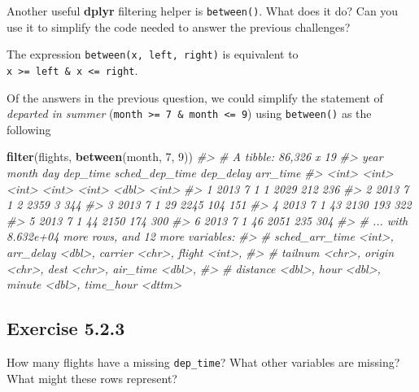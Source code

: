 \documentclass[]{book}
\newenvironment{Shaded}{\begin{snugshade}}{\end{snugshade}}
\newcommand{\CommentTok}[1]{\textcolor[rgb]{0.56,0.35,0.01}{\textit{#1}}}
\newcommand{\DecValTok}[1]{\textcolor[rgb]{0.00,0.00,0.81}{#1}}
\newcommand{\KeywordTok}[1]{\textcolor[rgb]{0.13,0.29,0.53}{\textbf{#1}}}
\newcommand{\NormalTok}[1]{#1}
\theoremstyle{plain}
\theoremstyle{remark}
\begin{document}
Another useful \textbf{dplyr} filtering helper is \texttt{between()}.
What does it do? Can you use it to simplify the code needed to answer
the previous challenges?

The expression \texttt{between(x,\ left,\ right)} is equivalent to
\texttt{x\ \textgreater{}=\ left\ \&\ x\ \textless{}=\ right}.

Of the answers in the previous question, we could simplify the statement
of \emph{departed in summer}
(\texttt{month\ \textgreater{}=\ 7\ \&\ month\ \textless{}=\ 9}) using
\texttt{between()} as the following

\begin{Shaded}
\begin{Highlighting}[]
\KeywordTok{filter}\NormalTok{(flights, }\KeywordTok{between}\NormalTok{(month, }\DecValTok{7}\NormalTok{, }\DecValTok{9}\NormalTok{))}
\CommentTok{#> # A tibble: 86,326 x 19}
\CommentTok{#>    year month   day dep_time sched_dep_time dep_delay arr_time}
\CommentTok{#>   <int> <int> <int>    <int>          <int>     <dbl>    <int>}
\CommentTok{#> 1  2013     7     1        1           2029       212      236}
\CommentTok{#> 2  2013     7     1        2           2359         3      344}
\CommentTok{#> 3  2013     7     1       29           2245       104      151}
\CommentTok{#> 4  2013     7     1       43           2130       193      322}
\CommentTok{#> 5  2013     7     1       44           2150       174      300}
\CommentTok{#> 6  2013     7     1       46           2051       235      304}
\CommentTok{#> # ... with 8.632e+04 more rows, and 12 more variables:}
\CommentTok{#> #   sched_arr_time <int>, arr_delay <dbl>, carrier <chr>, flight <int>,}
\CommentTok{#> #   tailnum <chr>, origin <chr>, dest <chr>, air_time <dbl>,}
\CommentTok{#> #   distance <dbl>, hour <dbl>, minute <dbl>, time_hour <dttm>}
\end{Highlighting}
\end{Shaded}

\hypertarget{exercise-5.2.3}{%
\subsection*{\texorpdfstring{Exercise
{5.2.3}}{Exercise 5.2.3}}\label{exercise-5.2.3}}

How many flights have a missing \texttt{dep\_time}? What other variables
are missing? What might these rows represent?
\end{document}
